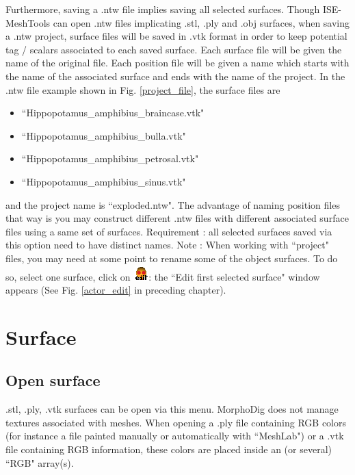 Furthermore, saving a .ntw file implies saving all selected surfaces. Though ISE-MeshTools can open .ntw files implicating .stl, .ply and .obj surfaces, when saving a .ntw project, surface files will be saved in .vtk format in order to keep potential tag / scalars associated to each saved surface. Each surface file will be given the name of the original file. Each position file will be given a name which starts with the name of the associated surface and ends with the name of the project. In the .ntw file example shown in Fig. \ref{project_file}, the surface files are 
\begin{itemize}
\item ``Hippopotamus\_amphibius\_braincase.vtk" 
\item ``Hippopotamus\_amphibius\_bulla.vtk" 
\item ``Hippopotamus\_amphibius\_petrosal.vtk" 
\item ``Hippopotamus\_amphibius\_sinus.vtk" 
\end{itemize}
\noindent and the project name is ``exploded.ntw". The advantage of naming position files that way is you may construct different .ntw files with different associated surface files using a same set of surfaces. Requirement : all selected surfaces saved via this option
need to have distinct names. Note : When working with ``project" files, you may need at
some point to rename some of the object surfaces. To do so, select one surface, click on \includegraphics[scale=0.7]{images/06/objects/actor_edit.png}: the ``Edit first selected surface" window appears (See Fig. \ref{actor_edit} in preceding chapter).




\section{Surface}
\subsection{Open surface}
.stl, .ply, .vtk surfaces can be open via this menu. MorphoDig does not manage textures associated with meshes. When opening a .ply file containing RGB colors (for instance a file painted manually or automatically with ``MeshLab") or a .vtk file containing RGB information, these colors are placed inside an (or several) ``RGB" array(s). 

